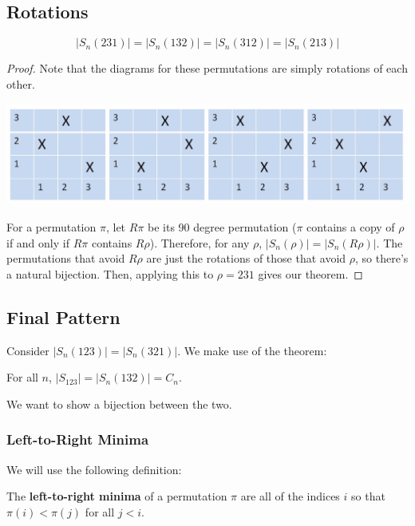 \documentclass[letterpaper]{article}
\begin{document}
\subsection{Rotations}
\begin{lemma}{}{}
    \[|S_{n}(231)| = |S_{n}(132)| = |S_{n}(312)| = |S_{n}(213)|\]
\end{lemma}
\begin{proof}
    Note that the diagrams for these permutations are simply rotations of each other.
    \begin{center}
        \includegraphics[scale=0.4]{img/perm_rotation.PNG}
    \end{center}
    For a permutation $\pi$, let $R\pi$ be its 90 degree permutation ($\pi$ contains a copy of $\rho$ if and only if $R\pi$ contains $R\rho$). Therefore, for any $\rho$, $|S_{n}(\rho)| = |S_{n}(R\rho)|$. The permutations that avoid $R\rho$ are just the rotations of those that avoid $\rho$, so there's a natural bijection. Then, applying this to $\rho = 231$ gives our theorem. 
\end{proof}

\subsection{Final Pattern}
Consider $|S_{n}(123)| = |S_{n}(321)|$. We make use of the theorem:
\begin{theorem}{}{}
    For all $n$, $|S_{123}| = |S_{n}(132)| = C_n$. 
\end{theorem} 
We want to show a bijection between the two. 

\subsubsection{Left-to-Right Minima}
We will use the following definition:
\begin{definition}{}{}
    The \textbf{left-to-right minima} of a permutation $\pi$ are all of the indices $i$ so that $\pi(i) < \pi(j)$ for all $j < i$. 
\end{definition}
\end{document}
